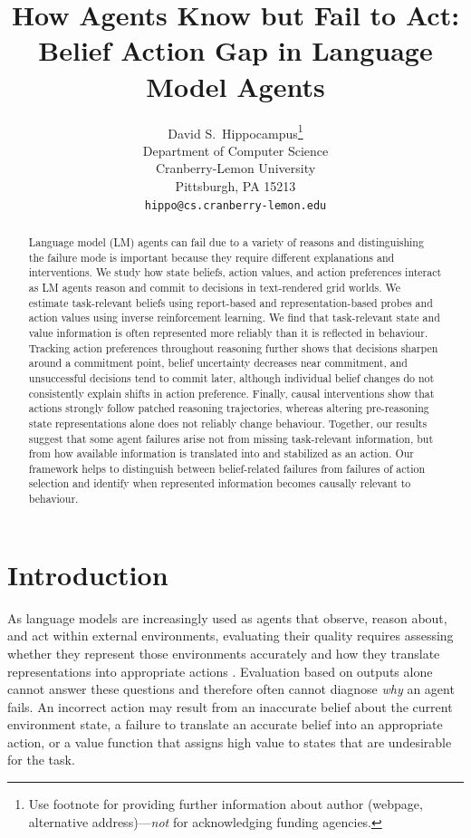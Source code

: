 \documentclass{article}
\title{How Agents Know but Fail to Act:\\ Belief Action Gap in Language Model Agents}
\author{%
  David S.~Hippocampus\thanks{Use footnote for providing further information
    about author (webpage, alternative address)---\emph{not} for acknowledging
    funding agencies.} \\
  Department of Computer Science\\
  Cranberry-Lemon University\\
  Pittsburgh, PA 15213 \\
  \texttt{hippo@cs.cranberry-lemon.edu} \\
}
\begin{document}
\maketitle


\begin{abstract}
Language model (LM) agents can fail due to a variety of reasons and distinguishing the failure mode is important because they require different explanations and interventions. We study how state beliefs, action values, and action preferences interact as LM agents reason and commit to decisions in text-rendered grid worlds. We estimate task-relevant beliefs using report-based and representation-based probes and action values using inverse reinforcement learning. We find that task-relevant state and value information is often represented more reliably than it is reflected in behaviour. Tracking action preferences throughout reasoning further shows that decisions sharpen around a commitment point, belief uncertainty decreases near commitment, and unsuccessful decisions tend to commit later, although individual belief changes do not consistently explain shifts in action preference. Finally, causal interventions show that actions strongly follow patched reasoning trajectories, whereas altering pre-reasoning state representations alone does not reliably change behaviour. Together, our results suggest that some agent failures arise not from missing task-relevant information, but from how available information is translated into and stabilized as an action. Our framework helps to distinguish between belief-related failures from failures of action selection and identify when represented information becomes causally relevant to behaviour.

\end{abstract}


\section{Introduction}

As language models are increasingly used as agents that observe, reason about, and act within external environments, evaluating their quality requires assessing whether they represent those environments accurately and how they translate representations into appropriate actions \cite{wang2024survey}. Evaluation based on outputs alone cannot answer these questions and therefore often cannot diagnose \emph{why} an agent fails. An incorrect action may result from an inaccurate belief about the current environment state, a failure to translate an accurate belief into an appropriate action, or a value function that assigns high value to states that are undesirable for the task.
\end{document}
